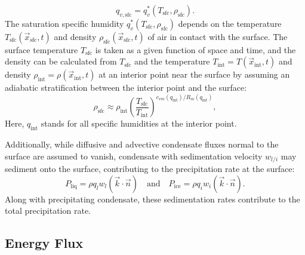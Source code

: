 \documentclass{report}
\begin{document}
\begin{enumerate}
     \[
    q_{v, \mathrm{sfc}} =q_v^*(T_\mathrm{sfc}, \rho_\mathrm{sfc}).
    \]
    The saturation specific humidity $q_v^*(T_\mathrm{sfc}, \rho_\mathrm{sfc})$ depends on the temperature $T_\mathrm{sfc}(\vec{x}_\mathrm{sfc}, t)$ and density $\rho_\mathrm{sfc}(\vec{x}_\mathrm{sfc}, t)$ of air in contact with the surface. The surface temperature $T_\mathrm{sfc}$ is taken as a given function of space and time, and the density can be calculated from $T_\mathrm{sfc}$ and the temperature $T_\mathrm{int} = T(\vec{x}_\mathrm{int}, t)$ and density $\rho_\mathrm{int} = \rho(\vec{x}_\mathrm{int}, t)$ at an interior point near the surface by assuming an adiabatic stratification between the interior point and the surface:
    \begin{equation}\label{e:sfc_density}
    \rho_\mathrm{sfc} \approx \rho_\mathrm{int} \left( \frac{T_\mathrm{sfc}}{T_\mathrm{int}} \right)^{c_{vm}(q_\mathrm{int})/R_m(q_\mathrm{int})},
    \end{equation}
    Here, $q_\mathrm{int}$ stands for all specific humidities at the interior point.
\end{enumerate}

Additionally, while diffusive and advective condensate fluxes normal to the surface are assumed to vanish, condensate with sedimentation velocity $w_{l/i}$ may sediment onto the surface, contributing to the precipitation rate at the surface:
\begin{equation}
    P_{\mathrm{liq}} = \rho q_{l} w_{l} (\vec{k} \cdot \vec{n}) \quad \text{and} \quad  P_{\mathrm{ice}} = \rho q_{i} w_{i} (\vec{k} \cdot \vec{n}).
\end{equation}
Along with precipitating condensate, these sedimentation rates contribute to the total precipitation rate.

\subsection{Energy Flux}
\end{document}
